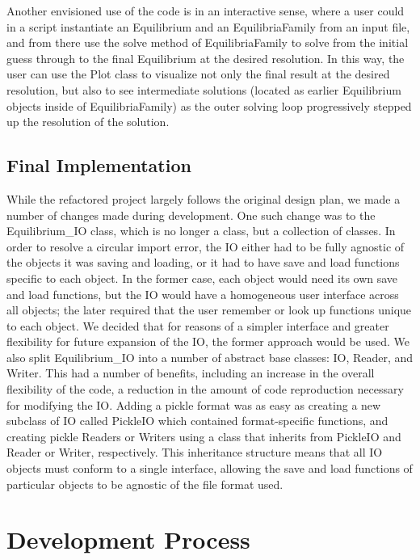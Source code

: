 \documentclass{article}
\begin{document}
Another envisioned use of the code is in an interactive sense, where a user could in a script instantiate an Equilibrium and an EquilibriaFamily from an input file, and from there use the solve method of EquilibriaFamily to solve from the initial guess through to the final Equilibrium at the desired resolution. In this way, the user can use the Plot class to visualize not only the final result at the desired resolution, but also to see intermediate solutions (located as earlier Equilibrium objects inside of EquilibriaFamily) as the outer solving loop progressively stepped up the resolution of the solution.

\subsection{Final Implementation}
While the refactored project largely follows the original design plan, we made a number of changes made during development.
One such change was to the Equilibrium\_IO class, which is no longer a class, but a collection of classes.
In order to resolve a circular import error, the IO either had to be fully agnostic of the objects it was saving and loading, or it had to have save and load functions specific to each object.
In the former case, each object would need its own save and load functions, but the IO would have a homogeneous user interface across all objects; the later required that the user remember or look up functions unique to each object.
We decided that for reasons of a simpler interface and greater flexibility for future expansion of the IO, the former approach would be used.
We also split Equilibrium\_IO into a number of abstract base classes: IO, Reader, and Writer.
This had a number of benefits, including an increase in the overall flexibility of the code, a reduction in the amount of code reproduction necessary for modifying the IO.
Adding a pickle format was as easy as creating a new subclass of IO called PickleIO which contained format-specific functions, and creating pickle Readers or Writers using a class that inherits from PickleIO and Reader or Writer, respectively.
This inheritance structure means that all IO objects must conform to a single interface, allowing the save and load functions of particular objects to be agnostic of the file format used.

\section{Development Process}
\end{document}
